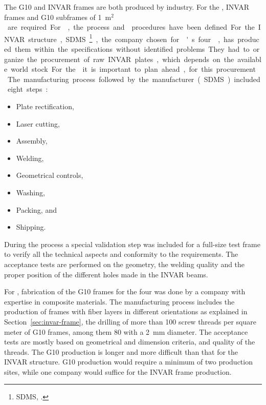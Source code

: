 The G10 and INVAR frames are both produced by industry. For the , %
\dptotcrp INVAR frames and \dpnumpmtch %
G10 subframes of \SI{1}{m$^2$} are required. %
For , the process and  procedures have been defined.
For the INVAR structure, SDMS~\footnote{SDMS\texttrademark{}, \url{}.}, the company chosen for 's four ,  %
has produced them within the specifications without identified problems.
They had to organize the procurement of raw INVAR plates, which depends on the available world stock. For the  it is important to plan ahead, %
 for this procurement. 
The manufacturing process followed by the manufacturer (SDMS) included eight steps:\\
\begin{itemize}
\item Plate rectification,
\item  Laser cutting,
\item  Assembly,
\item  Welding,
\item  Geometrical controls,
\item  Washing,
\item  Packing, and
\item  Shipping.
\end{itemize}

During the process a special validation step was included  for a full-size test frame to verify all the technical aspects and conformity to the requirements. 
The acceptance tests are performed on the geometry, the welding quality and the proper position of the different holes made in the INVAR beams.

For , fabrication of the G10 frames for the four  was done by a company with expertise in composite materials. The manufacturing process includes the %
production of frames with fiber layers in different orientations as explained in Section~\ref{sec:invar-frame}, the drilling of more than \num{100} screw threads per square meter of G10 frames, among them \num{80} with a \SI{2}{mm} diameter.
The acceptance tests are mostly based on geometrical and dimension criteria, and quality of the threads.  
The G10 production is longer and more difficult than that for the INVAR structure. G10 production would require a minimum of two production sites, while one company would suffice for the INVAR frame production.


